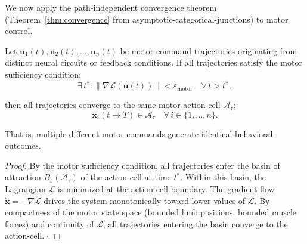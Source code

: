 We now apply the path-independent convergence theorem (Theorem~\ref{thm:convergence} from asymptotic-categorical-junctions) to motor control.

\begin{theorem}
\label{thm:convergence-motor}
Let $\mathbf{u}_1(t), \mathbf{u}_2(t), \ldots, \mathbf{u}_n(t)$ be motor command trajectories originating from distinct neural circuits or feedback conditions. If all trajectories satisfy the motor sufficiency condition:
\begin{equation}
  \exists\, t^* : \|\nabla \mathcal{L}(\mathbf{u}(t))\| < \varepsilon_{\text{motor}} \quad \forall\, t > t^*,
\end{equation}

then all trajectories converge to the same motor action-cell $\mathcal{A}_\tau$:
\begin{equation}
  \mathbf{x}_i(t \to T) \in \mathcal{A}_\tau \quad \forall\, i \in \{1, \ldots, n\}.
\end{equation}

That is, multiple different motor commands generate identical behavioral outcomes.
\end{theorem}

\begin{proof}
By the motor sufficiency condition, all trajectories enter the basin of attraction $B_{\varepsilon}(\mathcal{A}_\tau)$ of the action-cell at time $t^*$. Within this basin, the Lagrangian $\mathcal{L}$ is minimized at the action-cell boundary. The gradient flow $\dot{\mathbf{x}} = -\nabla \mathcal{L}$ drives the system monotonically toward lower values of $\mathcal{L}$. By compactness of the motor state space (bounded limb positions, bounded muscle forces) and continuity of $\mathcal{L}$, all trajectories entering the basin converge to the action-cell. $\square$
\end{proof}

